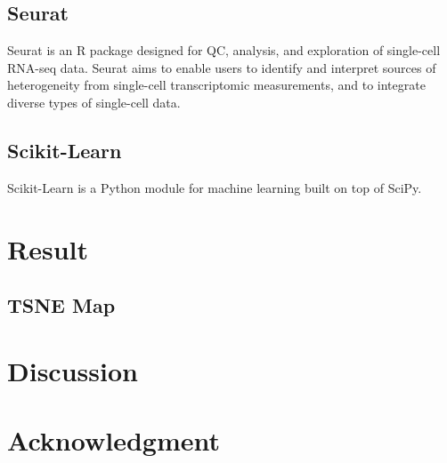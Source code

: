 \documentclass[aps, 10pt, a4paper]{article}
\begin{document}
        \subsection{Seurat}
            Seurat is an R package designed for QC, analysis, and exploration of single-cell RNA-seq data. Seurat aims to enable users to identify and interpret sources of heterogeneity from single-cell transcriptomic measurements, and to integrate diverse types of single-cell data. \cite{ref:seurat1, ref:seurat2}
        
        \subsection{Scikit-Learn}
            Scikit-Learn is a Python module for machine learning built on top of SciPy. \cite{ref:scikit}
    
    \section{Result}
        \subsection{TSNE Map}
    
    \section{Discussion}
    
    \section{Acknowledgment}
    
    
    

    
\end{document}
